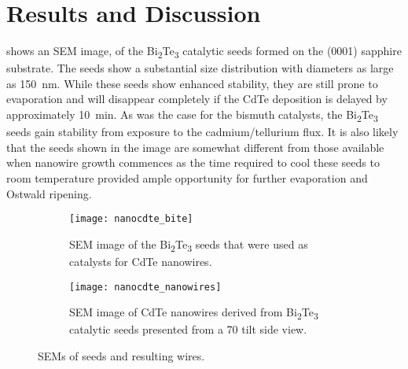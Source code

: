 \section{Results and Discussion}
 shows an SEM image, of the Bi\textsubscript{2}Te\textsubscript{3} catalytic seeds formed on the (0001) sapphire substrate.
The seeds show a substantial size distribution with diameters as large as 150~nm.
While these seeds show enhanced stability, they are still prone to evaporation and will disappear completely if the CdTe deposition is delayed by approximately 10~min.
As was the case for the bismuth catalysts, the Bi\textsubscript{2}Te\textsubscript{3} seeds gain stability from exposure to the cadmium/tellurium flux.
It is also likely that the seeds shown in the image are somewhat different from those available when nanowire growth commences as the time required to cool these seeds to room temperature provided ample opportunity for further evaporation and Ostwald ripening.
\begin{figure}
 \centering
 \begin{subfigure}[t]{0.47\textwidth}
  \centering \texttt{[image: nanocdte\_bite]}
  \caption{\label{fig:nanocdte_bite}SEM image of the Bi\textsubscript{2}Te\textsubscript{3} seeds that were used as catalysts for CdTe nanowires.}
 \end{subfigure}\quad%
 \begin{subfigure}[t]{0.47\textwidth}
  \centering \texttt{[image: nanocdte\_nanowires]}
  \caption{\label{fig:nanocdte_nanowires} SEM image of CdTe nanowires derived from Bi\textsubscript{2}Te\textsubscript{3} catalytic seeds presented from a 70\degree{} tilt side view.}
 \end{subfigure}
 \caption{\label{fig:nanocdte_sem}SEMs of seeds and resulting wires.}
\end{figure}

